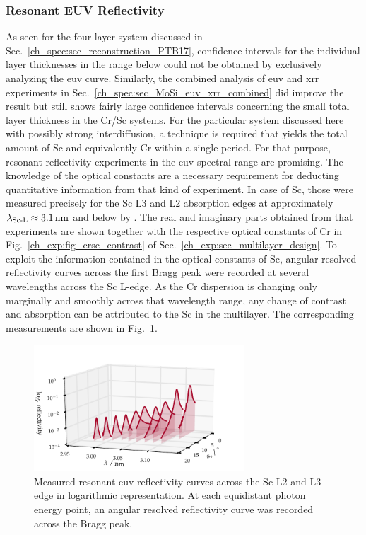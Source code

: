 \subsubsection{Resonant EUV Reflectivity}
As seen for the four layer system discussed in Sec.~\ref{ch_spec:sec_reconstruction_PTB17}, confidence intervals for the individual layer thicknesses in the range below  could not be obtained by exclusively analyzing the \gls{euv} curve. Similarly, the combined analysis of \gls{euv} and \gls{xrr} experiments in Sec.~\ref{ch_spec:sec_MoSi_euv_xrr_combined} did improve the result but still shows fairly large confidence intervals concerning the small total layer thickness in the Cr/Sc systems. For the particular system discussed here with possibly strong interdiffusion, a technique is required that yields the total amount of Sc and equivalently Cr within a single period. For that purpose, resonant reflectivity experiments in the \gls{euv} spectral range are promising. The knowledge of the optical constants are a necessary requirement for deducting quantitative information from that kind of experiment. In case of Sc, those were measured precisely for the Sc L3 and L2 absorption edges at approximately $\lambda_\text{Sc-L} \approx \nm{3.1}$ and below by \textcite{aquila_measurements_2004}. The real and imaginary parts obtained from that experiments are shown together with the respective optical constants of Cr in Fig.~\ref{ch_exp:fig_crsc_contrast} of Sec.~\ref{ch_exp:sec_multilayer_design}. To exploit the information contained in the optical constants of Sc, angular resolved reflectivity curves across the first Bragg peak were recorded at several wavelengths across the Sc L-edge. As the Cr dispersion is changing only marginally and smoothly across that wavelength range, any change of contrast and absorption can be attributed to the Sc in the multilayer. The corresponding measurements are shown in Fig.~\ref{ch_spec:fig_CrSc_REUV_data}.
\begin{figure}[htbp]
  \centering
  \includegraphics[width=0.7\textwidth]{img/CrSc_REUV_data}
  \caption[Measured resonant EUV reflectivity curves across the Sc L2 and L3-edge in logarithmic representation.]{Measured resonant \gls{euv} reflectivity curves across the Sc L2 and L3-edge in logarithmic representation. At each equidistant photon energy point, an angular resolved reflectivity curve was recorded across the Bragg peak.}
  \label{ch_spec:fig_CrSc_REUV_data}
\end{figure}
